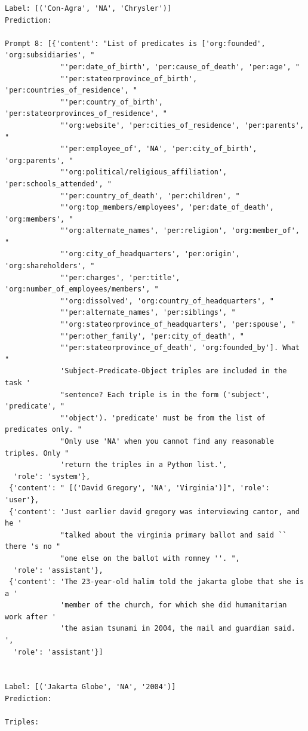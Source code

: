 \documentclass{article}
\begin{document}
\begin{lstlisting}
Label: [('Con-Agra', 'NA', 'Chrysler')]
Prediction:

Prompt 8: [{'content': "List of predicates is ['org:founded', 'org:subsidiaries', "
             "'per:date_of_birth', 'per:cause_of_death', 'per:age', "
             "'per:stateorprovince_of_birth', 'per:countries_of_residence', "
             "'per:country_of_birth', 'per:stateorprovinces_of_residence', "
             "'org:website', 'per:cities_of_residence', 'per:parents', "
             "'per:employee_of', 'NA', 'per:city_of_birth', 'org:parents', "
             "'org:political/religious_affiliation', 'per:schools_attended', "
             "'per:country_of_death', 'per:children', "
             "'org:top_members/employees', 'per:date_of_death', 'org:members', "
             "'org:alternate_names', 'per:religion', 'org:member_of', "
             "'org:city_of_headquarters', 'per:origin', 'org:shareholders', "
             "'per:charges', 'per:title', 'org:number_of_employees/members', "
             "'org:dissolved', 'org:country_of_headquarters', "
             "'per:alternate_names', 'per:siblings', "
             "'org:stateorprovince_of_headquarters', 'per:spouse', "
             "'per:other_family', 'per:city_of_death', "
             "'per:stateorprovince_of_death', 'org:founded_by']. What "
             'Subject-Predicate-Object triples are included in the task '
             "sentence? Each triple is in the form ('subject', 'predicate', "
             "'object'). 'predicate' must be from the list of predicates only. "
             "Only use 'NA' when you cannot find any reasonable triples. Only "
             'return the triples in a Python list.',
  'role': 'system'},
 {'content': " [('David Gregory', 'NA', 'Virginia')]", 'role': 'user'},
 {'content': 'Just earlier david gregory was interviewing cantor, and he '
             "talked about the virginia primary ballot and said `` there 's no "
             "one else on the ballot with romney ''. ",
  'role': 'assistant'},
 {'content': 'The 23-year-old halim told the jakarta globe that she is a '
             'member of the church, for which she did humanitarian work after '
             'the asian tsunami in 2004, the mail and guardian said. ',
  'role': 'assistant'}]


Label: [('Jakarta Globe', 'NA', '2004')]
Prediction:

Triples:


\end{lstlisting}
\end{document}
